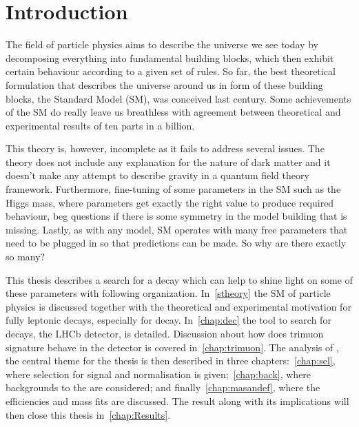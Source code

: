 \chapter{Introduction}



The field of particle physics aims to describe the universe we see today by decomposing everything into fundamental building blocks, which then exhibit certain behaviour according to a given set of rules. So far, the best theoretical formulation that describes the universe around us in form of these building blocks, the Standard Model (\Gls{SM}), was conceived last century. Some achievements of the \gls{SM} do really leave us breathless with agreement between theoretical and experimental results of ten parts in a billion. 

This theory is, however, incomplete as it fails to address several issues. The theory does not include any explanation for the nature of dark matter and it doesn't make any attempt to describe gravity in a quantum field theory framework. Furthermore, fine-tuning of some parameters in the \gls{SM} such as the Higgs mass, where parameters get exactly the right value to produce required behaviour, beg questions if there is some symmetry in the model building that is missing. Lastly, as with any model, \gls{SM} operates with many free parameters that need to be plugged in so that predictions can be made. So why are there exactly so many?

This thesis describes a search for a decay which can help to shine light on some of these parameters with following organization. In~\autoref{stheory} the \gls{SM} of particle physics is discussed together with the theoretical and experimental motivation for fully leptonic decays, especially for \Bmumumu decay. In~\autoref{chap:dec} the tool to search for \Bmumumu decays, the LHCb detector, is detailed. Discussion about how does trimuon signature behave in the detector is covered in~\autoref{chap:trimuon}. The analysis of \Bmumumu, the central theme for the thesis is then described in three chapters:~\autoref{chap:sel}, where selection for signal and normalisation is given;~\autoref{chap:back}, where backgrounds to the \Bmumumu are considered; and finally~\autoref{chap:masandef}, where the efficiencies and mass fits are discussed. The result along with its implications will then close this thesis in~\autoref{chap:Results}.

